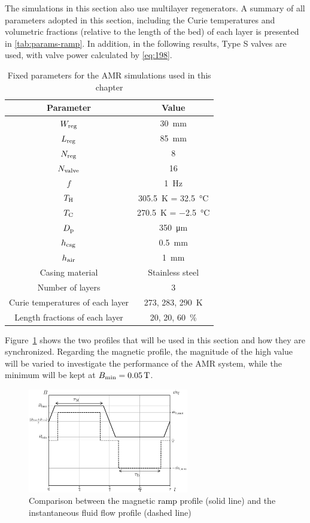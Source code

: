 \documentclass[referee]{svjour3}
\newcommand{\bmin}{\ensuremath{{B}\ped{min}}}
\begin{document}
The simulations in this section also use multilayer regenerators. A summary of all parameters adopted in this section, including the Curie temperatures and volumetric fractions (relative to the length of the bed) of each layer is presented in \autoref{tab:params-ramp}. In addition, in the following results, Type S valves are used, with valve power calculated by \autoref{eq:198}.

\begin{table}[!ht]
  \centering
  \begin{tabular}{c|c}
\hline
    \textbf{Parameter} & \textbf{Value} \\
\hline
$W_{\mathrm{reg}}$ & \SI{30}{\mm} \\
$L_{\mathrm{reg}}$ & \SI{85}{\mm} \\
$N_{\mathrm{reg}}$ & \num{8} \\
$N_{\mathrm{valve}}$ & \num{16} \\
$f$ & \SI{1}{\hertz} \\
$T_{\mathrm{H}}$ & \SI{305.5}{\kelvin} = \SI{32.5}{\celsius} \\
$T_{\mathrm{C}}$ & \SI{270.5}{\kelvin} = \SI{-2.5}{\celsius} \\
$D_{\mathrm{p}}$ & \SI{350}{\micro\meter} \\
$h_{\mathrm{csg}}$ & \SI{0.5}{\mm} \\
$h_{\mathrm{air}}$ & \SI{1}{\mm} \\
Casing material & Stainless steel \\
Number of layers & \num{3} \\
Curie temperatures of each layer & \num{273}, \num{283}, \SI{290}{\kelvin} \\ 
Length fractions of each layer & \num{20}, \num{20}, \SI{60}{\percent}\\
\hline
  \end{tabular}
  \caption{Fixed parameters for the AMR simulations used in this chapter}
  \label{tab:params-ramp}
\end{table}

 Figure~\ref{fig:ramp-inst} shows the two profiles that will be used in this section and how they are synchronized. Regarding the magnetic profile, the magnitude of the high value will be varied to investigate the performance of the AMR system, while the minimum will be kept at $\bmin = \SI{0.05}{\tesla}$. 

\begin{figure}[!ht]
  \centering
  \includegraphics[width=7cm]{Fig13-profiles_rm_and_flow_instantaneous}
  \caption{Comparison between the magnetic \textcolor{black}{ramp} profile (solid line) and the instantaneous fluid flow profile (dashed line)}
  \label{fig:ramp-inst}
\end{figure}
 
\end{document}
